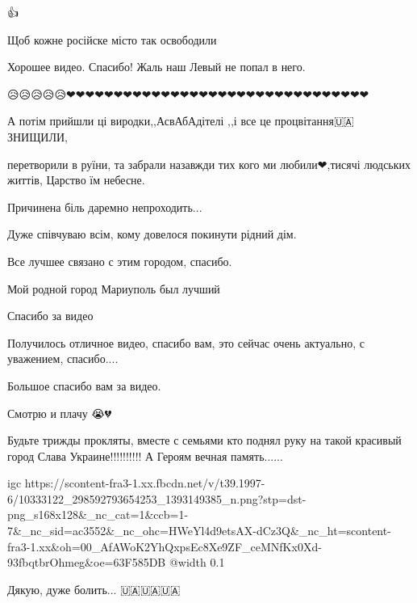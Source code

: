 👍💙💛


Щоб кожне російске місто так освободили


Хорошее видео. Спасибо! Жаль наш Левый не попал в него.


😥😥😥😥😥❤❤❤❤❤❤❤❤❤❤❤❤❤❤❤❤❤❤❤❤❤❤❤❤❤❤❤❤❤❤❤❤


А потім прийшли ці виродки,,АсвАбАдітелі
,,і все це процвітання🇺🇦 ЗНИЩИЛИ,

перетворили в руїни, та забрали назавжди тих кого ми любили❤,тисячі людських
життів, Царство їм небесне.🙏

Причинена біль даремно непроходить...


Дуже співчуваю всім, кому довелося покинути рідний дім.


Все лучшее связано с этим городом, спасибо.


Мой родной город Мариуполь был лучший


Спасибо за видео


Получилось отличное видео, спасибо вам, это сейчас очень актуально, с
уважением, спасибо....


Большое спасибо вам за видео.


Смотрю и плачу 😭💔


Будьте трижды прокляты, вместе с семьями кто поднял руку на такой красивый
город Слава Украине!!!!!!!!!! А Героям вечная память......

\ifcmt
  igc https://scontent-fra3-1.xx.fbcdn.net/v/t39.1997-6/10333122_298592793654253_1393149385_n.png?stp=dst-png_s168x128&_nc_cat=1&ccb=1-7&_nc_sid=ac3552&_nc_ohc=HWeYl4d9etsAX-dCz3Q&_nc_ht=scontent-fra3-1.xx&oh=00_AfAWoK2YhQxpsEc8Xe9ZF_ceMNfKx0Xd-93fbqtbrOhmeg&oe=63F585DB
	@width 0.1
\fi


Дякую, дуже болить... 🇺🇦🇺🇦🇺🇦🙏🙏🙏

